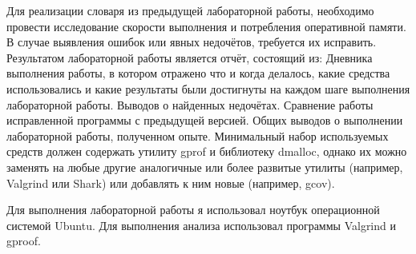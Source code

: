 \documentclass[pdf, unicode, 12pt, a4paper,oneside,fleqn]{article}
\begin{document}
    \CWProblem
    {Для реализации словаря из предыдущей лабораторной работы, необходимо провести исследование скорости выполнения и потребления оперативной памяти. В случае выявления ошибок или явных недочётов, требуется их исправить.
    Результатом лабораторной работы является отчёт, состоящий из:
    Дневника выполнения работы, в котором отражено что и когда делалось, какие средства использовались и какие результаты были достигнуты на каждом шаге выполнения лабораторной работы.
    Выводов о найденных недочётах.
    Сравнение работы исправленной программы с предыдущей версией.
    Общих выводов о выполнении лабораторной работы, полученном опыте.
    Минимальный набор используемых средств должен содержать утилиту gprof и библиотеку dmalloc, однако их можно заменять на любые другие аналогичные или более развитые утилиты (например, Valgrind или Shark) или добавлять к ним новые (например, gcov).}
    
    Для выполнения лабораторной работы я использовал ноутбук операционной системой Ubuntu. Для выполнения анализа использовал программы Valgrind и gproof.
    \pagebreak
\end{document}

